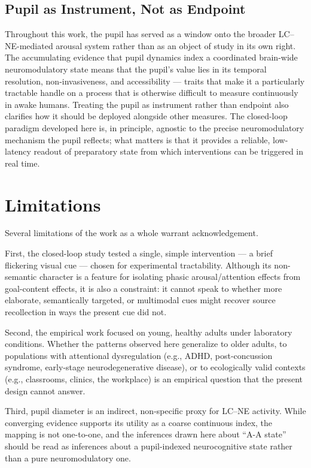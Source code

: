 \subsection*{Pupil as Instrument, Not as Endpoint}

Throughout this work, the pupil has served as a window onto the broader LC--NE-mediated arousal system rather than as an object of study in its own right. The accumulating evidence that pupil dynamics index a coordinated brain-wide neuromodulatory state \parencite{joshi2016relationships,joshi2020pupil} means that the pupil's value lies in its temporal resolution, non-invasiveness, and accessibility --- traits that make it a particularly tractable handle on a process that is otherwise difficult to measure continuously in awake humans. Treating the pupil as instrument rather than endpoint also clarifies how it should be deployed alongside other measures. The closed-loop paradigm developed here is, in principle, agnostic to the precise neuromodulatory mechanism the pupil reflects; what matters is that it provides a reliable, low-latency readout of preparatory state from which interventions can be triggered in real time.

\section{Limitations}

Several limitations of the work as a whole warrant acknowledgement.

First, the closed-loop study tested a single, simple intervention --- a brief flickering visual cue --- chosen for experimental tractability. Although its non-semantic character is a feature for isolating phasic arousal/attention effects from goal-content effects, it is also a constraint: it cannot speak to whether more elaborate, semantically targeted, or multimodal cues might recover source recollection in ways the present cue did not.

Second, the empirical work focused on young, healthy adults under laboratory conditions. Whether the patterns observed here generalize to older adults, to populations with attentional dysregulation (e.g., ADHD, post-concussion syndrome, early-stage neurodegenerative disease), or to ecologically valid contexts (e.g., classrooms, clinics, the workplace) is an empirical question that the present design cannot answer.

Third, pupil diameter is an indirect, non-specific proxy for LC--NE activity. While converging evidence supports its utility as a coarse continuous index, the mapping is not one-to-one, and the inferences drawn here about ``A-A state'' should be read as inferences about a pupil-indexed neurocognitive state rather than a pure neuromodulatory one.

